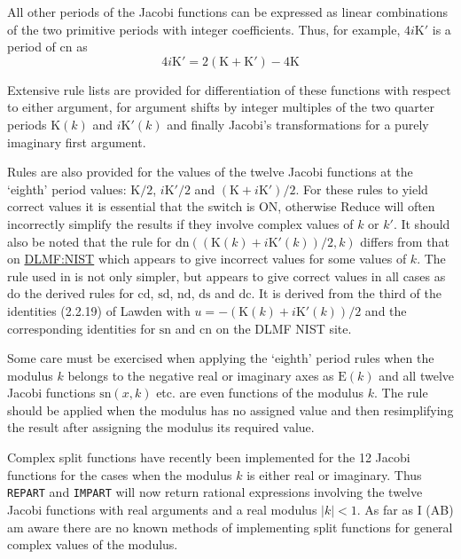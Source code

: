 All other periods of the Jacobi functions can be expressed as linear
combinations of the two primitive periods with integer coefficients.
Thus, for example, $4i\mathrm{K}'$ is a period of $\mathrm{cn}$ as
\[4i\mathrm{K}' = 2(\mathrm{K}+\mathrm{K}') -4\mathrm{K}\]

Extensive rule lists are provided for differentiation of these functions with
respect to either argument, for argument shifts by integer multiples of the
two quarter periods $\mathrm{K}(k)$ and $i\mathrm{K}'(k)$ and finally
Jacobi's transformations for a purely imaginary first argument.

Rules are also provided for the values of the twelve Jacobi functions at the
`eighth' period values: $\mathrm{K}/2$, $i\mathrm{K}'/2$ and
$(\mathrm{K}+i\mathrm{K}')/2$. For these rules to yield correct values it
is essential that the switch  is ON, otherwise Reduce will
often incorrectly simplify the results if they involve complex values of $k$ or
$k'$. It should also be noted that the rule for
$\mathrm{dn}((\mathrm{K}(k)+i\mathrm{K}'(k))/2, k)$ differs from that on
\href{https://dlmf.nist.gov/22.5#i}{DLMF:NIST} which appears to give incorrect
values for some values of $k$. The rule used in \REDUCE is not only simpler,
but appears to give correct values in all cases as do the derived rules for
$\mathrm{cd}$, $\mathrm{sd}$, $\mathrm{nd}$, $\mathrm{ds}$ and $\mathrm{dc}$.
It is derived from the third of the identities (2.2.19) of Lawden
\cite{Lawden:89} with $u =-(\mathrm{K}(k)+i\mathrm{K}'(k))/2$ and
the corresponding identities for $\mathrm{sn}$ and $\mathrm{cn}$ on the
DLMF NIST site.

Some care must be exercised when applying the `eighth' period rules when
the modulus $k$ belongs to the negative real or imaginary axes as
$\mathrm{E}(k)$ and all twelve Jacobi functions $\mathrm{sn}(x,k)$ etc. are
even functions of the modulus $k$. The rule should be applied when the modulus
has no assigned value and then resimplifying the result after assigning the
modulus its required value.

Complex split functions have recently been implemented for the 12 Jacobi
functions for the cases when the modulus $k$ is either real or imaginary.
Thus \texttt{REPART} and \texttt{IMPART} will now return rational expressions
involving the twelve Jacobi functions with real arguments and a real modulus
$|k|<1$. As far as I (AB) am aware there are no known methods of implementing
split functions for general complex values of the modulus.

